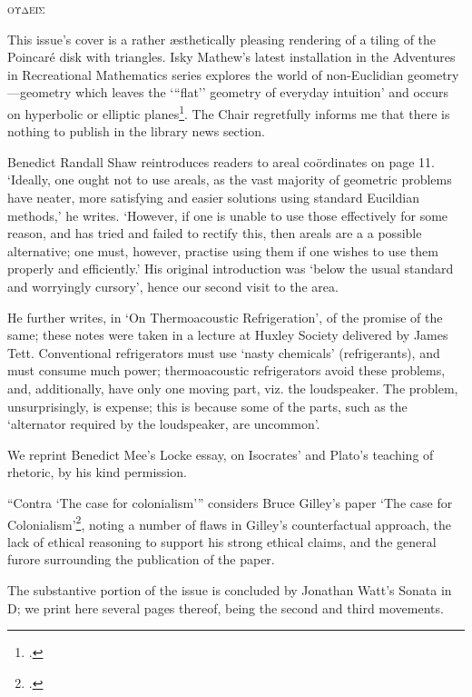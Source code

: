 \begin{multicols}{2}
\textgreek{\hspace{\fill}\textsc{ουδεις}}

\columnbreak

This issue's cover is a rather æsthetically pleasing rendering of a tiling of the Poincaré disk with triangles. Isky Mathew's latest installation in the Adventures in Recreational Mathematics series explores the world of non-Euclidian geometry---geometry which leaves the `{``}flat'' geometry of everyday intuition' and occurs on hyperbolic or elliptic planes\footcite{wolframalpha}. The Chair regretfully informs me that there is nothing to publish in the library news section.

Benedict Randall Shaw reintroduces readers to areal coördinates on page 11. `Ideally, one ought not to use areals, as the vast majority of geometric problems have neater, more satisfying and easier solutions using standard Eucildian methods,' he writes. `However, if one is unable to use those effectively for some reason, and has tried and failed to rectify this, then areals are a a possible alternative; one must, however, practise using them if one wishes to use them properly and efficiently.' His original introduction was `below the usual standard and worryingly cursory', hence our second visit to the area.

He further writes, in `On Thermoacoustic Refrigeration', of the promise of the same; these notes were taken in a lecture at Huxley Society delivered by James Tett. Conventional refrigerators must use `nasty chemicals' (refrigerants), and must consume much power; thermoacoustic refrigerators avoid these problems, and, additionally, have only one moving part, viz. the loudspeaker. The problem, unsurprisingly, is expense; this is because some of the parts, such as the `alternator required by the loudspeaker, are uncommon'. 
	
We reprint Benedict Mee's Locke essay, on Isocrates' and Plato's teaching of rhetoric, by his kind permission. 

``Contra `The case for colonialism''' considers Bruce Gilley's paper `The case for Colonialism'\footcite{gilley}, noting a number of flaws in Gilley's counterfactual approach, the lack of ethical reasoning to support his strong ethical claims, and the general furore surrounding the publication of the paper.

The substantive portion of the issue is concluded by Jonathan Watt's Sonata in D; we print here several pages thereof, being the second and third movements.


\end{multicols}
